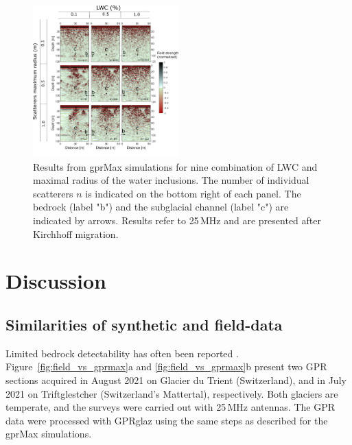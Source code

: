 \begin{figure}
    \centering
    \includegraphics[width=0.5\textwidth]{chapters/chapter_gprmax/Fig04.pdf}
    \caption{Results from gprMax simulations for nine combination of LWC and maximal radius of the water inclusions. The number of individual scatterers $n$ is indicated on the bottom right of each panel. The bedrock (label "b") and the subglacial channel (label "c") are indicated by arrows. Results refer to 25\,MHz and are presented after Kirchhoff migration.}
    \label{fig:gprmax_results}
\end{figure}


\section{Discussion}

\subsection{Similarities of synthetic and field-data}

Limited bedrock detectability has often been reported \citep[e.g.][]{langhammer&al2017,Grab&al2021,Rutishauser&al2016,Bradford&al2009}. Figure~\ref{fig:field_vs_gprmax}a and \ref{fig:field_vs_gprmax}b present two GPR sections acquired in August 2021 on Glacier du Trient (Switzerland), and in July 2021 on Triftglestcher (Switzerland's Mattertal), respectively. Both glaciers are temperate, and the surveys were carried out with 25\,MHz antennas. The GPR data were processed with GPRglaz using the same steps as described for the gprMax simulations.

